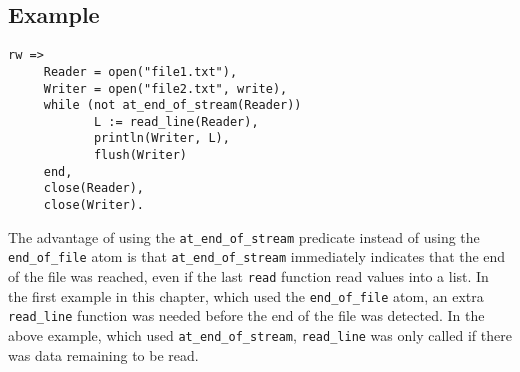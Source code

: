 \subsection*{Example}
\begin{verbatim}
rw =>
     Reader = open("file1.txt"),
     Writer = open("file2.txt", write),
     while (not at_end_of_stream(Reader))
            L := read_line(Reader),
            println(Writer, L),
            flush(Writer)
     end,
     close(Reader),
     close(Writer).
\end{verbatim}

The advantage of using the \texttt{at\_end\_of\_stream} predicate instead of using the \texttt{end\_of\_file} atom is that \texttt{at\_end\_of\_stream} immediately indicates that the end of the file was reached, even if the last \texttt{read} function read values into a list. In the first example in this chapter, which used the \texttt{end\_of\_file} atom, an extra \texttt{read\_line} function was needed before the end of the file was detected.  In the above example, which used \texttt{at\_end\_of\_stream}, \texttt{read\_line} was only called if there was data remaining to be read.

